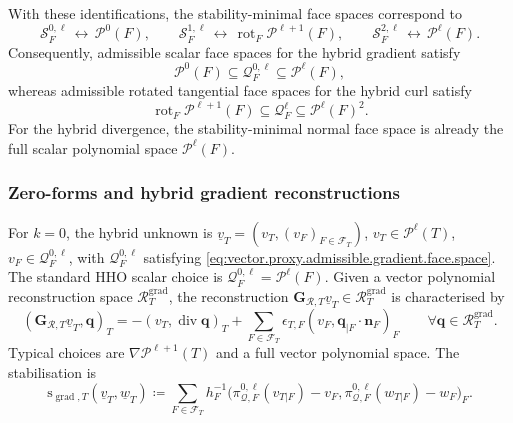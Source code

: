 \documentclass[a4paper,11pt]{article}
\theoremstyle{definition}
\newcommand{\piQ}[2]{\pi_{\mathcal Q,#1}^{#2,\ell}}
\newcommand{\epsTF}{\epsilon_{T,F}}
\begin{document}
With these identifications, the stability-minimal face spaces correspond to
\[
\mathcal S_F^{0,\ell}
\,\leftrightarrow\,
\mathcal P^0(F),
\qquad
\mathcal S_F^{1,\ell}
\,\leftrightarrow\,
\operatorname{rot}_F\mathcal P^{\ell+1}(F),
\qquad
\mathcal S_F^{2,\ell}
\,\leftrightarrow\,
\mathcal P^\ell(F).
\]
Consequently, admissible scalar face spaces for the hybrid gradient satisfy
\begin{equation}\label{eq:vector.proxy.admissible.gradient.face.space}
\mathcal P^0(F)
\subseteq \mathcal Q_F^{0,\ell}
\subseteq \mathcal P^\ell(F),
\end{equation}
whereas admissible rotated tangential face spaces for the hybrid curl satisfy
\begin{equation}\label{eq:vector.proxy.admissible.curl.face.space}
  \operatorname{rot}_F\mathcal P^{\ell+1}(F)
  \subseteq
  \boldsymbol{\mathcal Q}_F^\ell
  \subseteq
  \mathcal P^\ell(F)^2.
\end{equation}
For the hybrid divergence, the stability-minimal normal face space is already the full scalar polynomial space $\mathcal P^\ell(F)$.

\subsubsection{Zero-forms and hybrid gradient reconstructions}
\label{subsec:proxy.gradient}

For $k=0$, the hybrid unknown is $\underline v_T = (v_T,(v_F)_{F\in\mathcal F_T})$, $v_T\in\mathcal P^\ell(T)$, $v_F\in\mathcal Q_F^{0,\ell}$, with $\mathcal Q_F^{0,\ell}$ satisfying \eqref{eq:vector.proxy.admissible.gradient.face.space}.
The standard HHO scalar choice is $\mathcal Q_F^{0,\ell}=\mathcal P^\ell(F)$.
Given a vector polynomial reconstruction space $\boldsymbol{\mathcal R}_T^{\mathrm{grad}}$, the reconstruction $\boldsymbol G_{\mathcal R,T}\underline v_T \in \boldsymbol{\mathcal R}_T^{\mathrm{grad}}$ is characterised by
\[
  (\boldsymbol G_{\mathcal R,T}\underline v_T,
   \boldsymbol q)_T
  =
  -(v_T,\operatorname{div}\boldsymbol q)_T
  +
  \sum_{F\in\mathcal F_T}
  \epsTF
  (v_F,\boldsymbol q_{|F}\cdot\boldsymbol n_F)_F
  \qquad
  \forall\boldsymbol q\in
  \boldsymbol{\mathcal R}_T^{\mathrm{grad}}.
\]
Typical choices are $\nabla\mathcal P^{\ell+1}(T)$ and a full vector polynomial space.
The stabilisation is
\[
  \mathrm s_{\operatorname{grad},T}
  (\underline v_T,\underline w_T)
  \coloneqq
  \sum_{F\in\mathcal F_T}
  h_F^{-1}
  \bigl(
    \piQ{F}{0}(v_{T|F})-v_F,
    \piQ{F}{0}(w_{T|F})-w_F
  \bigr)_F.
\]
\end{document}
